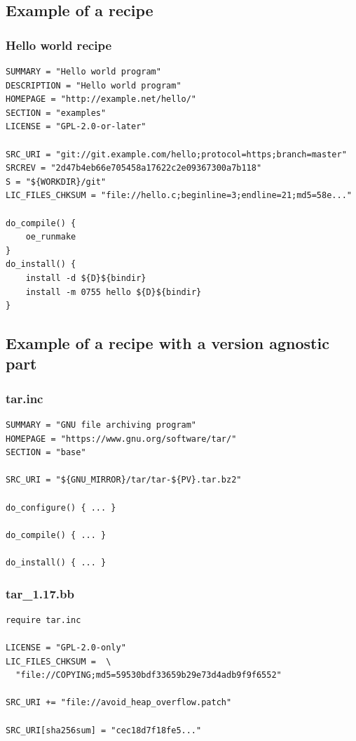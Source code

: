 \subsection{Example of a recipe}

\begin{frame}[fragile]
  \frametitle{Hello world recipe}
  \begin{block}{}
    \begin{verbatim}
SUMMARY = "Hello world program"
DESCRIPTION = "Hello world program"
HOMEPAGE = "http://example.net/hello/"
SECTION = "examples"
LICENSE = "GPL-2.0-or-later"

SRC_URI = "git://git.example.com/hello;protocol=https;branch=master"
SRCREV = "2d47b4eb66e705458a17622c2e09367300a7b118"
S = "${WORKDIR}/git"
LIC_FILES_CHKSUM = "file://hello.c;beginline=3;endline=21;md5=58e..."

do_compile() {
    oe_runmake
}
do_install() {
    install -d ${D}${bindir}
    install -m 0755 hello ${D}${bindir}
}
    \end{verbatim}
  \end{block}
\end{frame}

\subsection{Example of a recipe with a version agnostic part}

\begin{frame}[fragile]
  \frametitle{tar.inc}
  \begin{block}{}
    \begin{verbatim}
SUMMARY = "GNU file archiving program"
HOMEPAGE = "https://www.gnu.org/software/tar/"
SECTION = "base"

SRC_URI = "${GNU_MIRROR}/tar/tar-${PV}.tar.bz2"

do_configure() { ... }

do_compile() { ... }

do_install() { ... }
    \end{verbatim}
  \end{block}
\end{frame}

\begin{frame}[fragile]
  \frametitle{tar\_1.17.bb}
  \begin{block}{}
    \begin{verbatim}
require tar.inc

LICENSE = "GPL-2.0-only"
LIC_FILES_CHKSUM =  \
  "file://COPYING;md5=59530bdf33659b29e73d4adb9f9f6552"

SRC_URI += "file://avoid_heap_overflow.patch"

SRC_URI[sha256sum] = "cec18d7f18fe5..."
    \end{verbatim}
  \end{block}
\end{frame}

